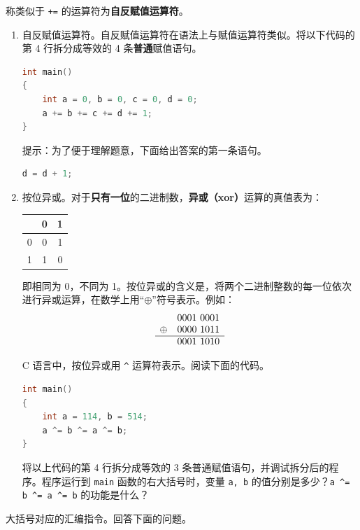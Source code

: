 \begin{problemset}
	称类似于 \lstinline{+=} 的运算符为\textbf{自反赋值运算符}。

	\begin{enumerate}
		\item 自反赋值运算符。自反赋值运算符在语法上与赋值运算符类似。将以下代码的第 4 行拆分成等效的 4 条\textbf{普通}赋值语句。

		\begin{lstlisting}[language=c]
int main()
{
	int a = 0, b = 0, c = 0, d = 0;
	a += b += c += d += 1;
}
		\end{lstlisting}

		提示：为了便于理解题意，下面给出答案的第一条语句。

		\begin{lstlisting}[language=c, numbers=none]
d = d + 1;
		\end{lstlisting}

		\item 按位异或。对于\textbf{只有一位}的二进制数，\textbf{异或（xor）}运算的真值表为：
		\begin{table}[H]
			\centering
			\begin{tabular}{c|c|c|}
				& 0 & 1
				\\\hline
				0 & 0 & 1
				\\\hline
				1 & 1 & 0
				\\\hline
			\end{tabular}
		\end{table}

		即相同为 0，不同为 1。按位异或的含义是，将两个二进制整数的每一位依次进行异或运算，在数学上用“$\oplus$”符号表示。例如：
		$$
		\begin{matrix}
			& 0001~0001
			\\
			{\oplus} & 0000~1011
			\\\hline
			& 0001~1010
		\end{matrix}
		$$

		C 语言中，按位异或用 \lstinline{^} 运算符表示。阅读下面的代码。

		\begin{lstlisting}[language=c]
int main()
{
	int a = 114, b = 514;
	a ^= b ^= a ^= b;
}
		\end{lstlisting}

		将以上代码的第 4 行拆分成等效的 3 条普通赋值语句，并调试拆分后的程序。程序运行到 \lstinline{main} 函数的右大括号时，变量 \lstinline{a, b} 的值分别是多少？\lstinline{a ^= b ^= a ^= b} 的功能是什么？
	\end{enumerate}

	\item 大括号对应的汇编指令。回答下面的问题。


\end{problemset}
